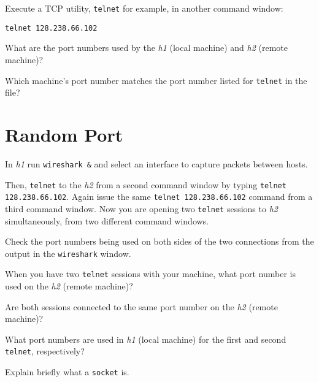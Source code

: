 \documentclass{../UTNetLab}
\begin{document}
    Execute a TCP utility, \lstinline{telnet} for example, in another command window:
    \begin{lstlisting}
telnet 128.238.66.102
    \end{lstlisting}
    
    \begin{report}
    \item What are the port numbers used by the \textit{h1} (local machine) and \textit{h2} (remote machine)?

    \item Which machine’s port number matches the port number listed for \lstinline{telnet} in the  file?
    \end{report}

\section{Random Port}
    In \textit{h1} run \lstinline{wireshark &} and select an interface to capture packets between hosts.

    Then, \lstinline{telnet} to the \textit{h2} from a second command window by typing \lstinline{telnet 128.238.66.102}.
    Again issue the same \lstinline{telnet 128.238.66.102} command from a third command window.
    Now you are opening two \lstinline{telnet} sessions to \textit{h2} simultaneously, from two different command windows.

    Check the port numbers being used on both sides of the two connections from the output in the \lstinline{wireshark} window.

    \begin{report}
    \item When you have two \lstinline{telnet} sessions with your machine, what port number is used on the \textit{h2} (remote machine)?

    \item Are both sessions connected to the same port number on the \textit{h2} (remote machine)?

    \item What port numbers are used in \textit{h1} (local machine) for the first and second \lstinline{telnet}, respectively?

    \item Explain briefly what a \lstinline[language=bash]{socket} is.
    \end{report}
\end{document}
